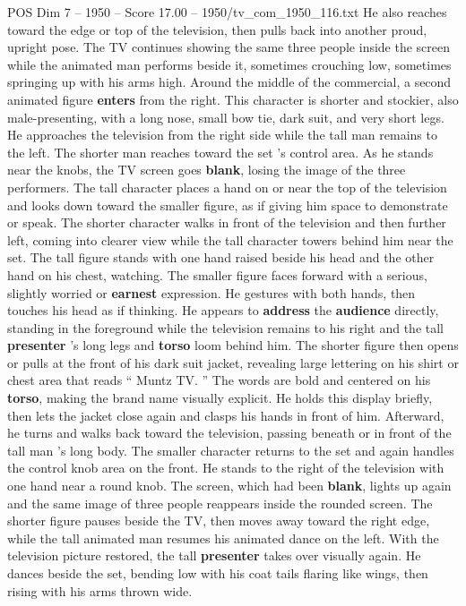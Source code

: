\begin{textsample}{POS Dim 7 – 1950 – Score 17.00 – 1950/tv\_com\_1950\_116.txt}
He also reaches toward the edge or top of the television, then pulls back into another proud, upright pose.
The TV continues showing the same three people inside the screen while the animated man performs beside it, sometimes crouching low, sometimes springing up with his arms high.
Around the middle of the commercial, a second animated figure \textbf{enters} from the right.
This character is shorter and stockier, also male-presenting, with a long nose, small bow tie, dark suit, and very short legs.
He approaches the television from the right side while the tall man remains to the left.
The shorter man reaches toward the set ’s control area.
As he stands near the knobs, the TV screen goes \textbf{blank}, losing the image of the three performers.
The tall character places a hand on or near the top of the television and looks down toward the smaller figure, as if giving him space to demonstrate or speak.
The shorter character walks in front of the television and then further left, coming into clearer view while the tall character towers behind him near the set.
The tall figure stands with one hand raised beside his head and the other hand on his chest, watching.
The smaller figure faces forward with a serious, slightly worried or \textbf{earnest} expression.
He gestures with both hands, then touches his head as if thinking.
He appears to \textbf{address} the \textbf{audience} directly, standing in the foreground while the television remains to his right and the tall \textbf{presenter} ’s long legs and \textbf{torso} loom behind him.
The shorter figure then opens or pulls at the front of his dark suit jacket, revealing large lettering on his shirt or chest area that reads “ Muntz TV. ” The words are bold and centered on his \textbf{torso}, making the brand name visually explicit.
He holds this display briefly, then lets the jacket close again and clasps his hands in front of him.
Afterward, he turns and walks back toward the television, passing beneath or in front of the tall man ’s long body.
The smaller character returns to the set and again handles the control knob area on the front.
He stands to the right of the television with one hand near a round knob.
The screen, which had been \textbf{blank}, lights up again and the same image of three people reappears inside the rounded screen.
The shorter figure pauses beside the TV, then moves away toward the right edge, while the tall animated man resumes his animated dance on the left.
With the television picture restored, the tall \textbf{presenter} takes over visually again.
He dances beside the set, bending low with his coat tails flaring like wings, then rising with his arms thrown wide.

\end{textsample}
